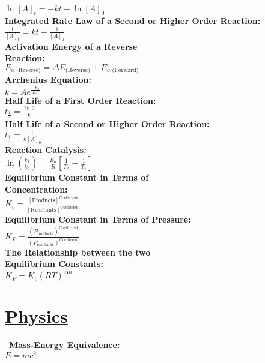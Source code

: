 \documentclass[12pt]{article}
\begin{document}
    \\ \( \ln[ A ]_t = -kt + \ln[ A ]_0 \)
\\ \textbf{Integrated Rate Law of a Second or Higher Order Reaction:}
    \\ \( \displaystyle\frac{ 1 }{ [ A ]_t } = kt + \displaystyle\frac{ 1 }{ [ A ]_0 } \)
\\ \textbf{Activation Energy of a Reverse \\Reaction:}
    \\ \( E_{a \text{ (Reverse)}} = \Delta E_{\text{(Reverse)}} + E_{a \text{ (Forward)}} \)
\\ \textbf{Arrhenius Equation:}
    \\ \( k = A e^{\frac{ -E_a }{ RT }} \)
\\ \textbf{Half Life of a First Order Reaction:}
    \\ \( t_{\frac{ 1 }{ 2 }} = \displaystyle\frac{ \ln 2 }{ k } \)
\\ \textbf{Half Life of a Second or Higher Order Reaction:}
    \\ \( t_{\frac{ 1 }{ 2 }} = \displaystyle\frac{ 1 }{ k [ A ]_0 } \)
\\ \textbf{Reaction Catalysis:}
    \\ \( \ln \left( \displaystyle\frac{ k_1 }{ k_2 } \right) = \displaystyle\frac{ E_a }{ R } \left[ \displaystyle\frac{ 1 }{ T_2 } - \displaystyle\frac{ 1 }{ T_1 } \right] \)
\\ \textbf{Equilibrium Constant in Terms of \\Concentration:}
    \\ \( K_c = \displaystyle\frac{ [ \text{Products} ]^{\text{Coefficient}} }{ [ \text{Reactants} ]^{\text{Coefficient}} } \)
\\ \textbf{Equilibrium Constant in Terms of Pressure:}
    \\ \( K_P = \displaystyle\frac{ ( P_{\text{products}} )^{\text{Coefficient}} }{ ( P_{\text{reactants}} )^{\text{Coefficient}} } \)
\\ \textbf{The Relationship between the two \\Equilibrium Constants:}
    \\ \( K_P = K_c ( RT )^{\Delta n} \)



\section*{\underline{Physics}}\
\textbf{Mass-Energy Equivalence:}
    \\ \( E = mc^2 \)
    
\end{document}
